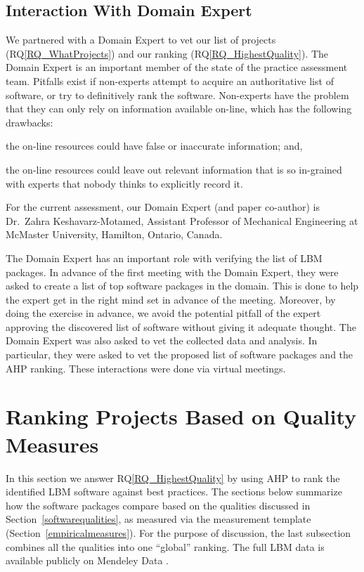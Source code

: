 \documentclass[final, 3p, times, authoryear]{elsarticle}
\newcommand{\rqref}[1]{RQ\ref{#1}}
\begin{document}
\subsection{Interaction With Domain Expert} \label{sec_vet_software_list}

We partnered with a Domain Expert to vet our list of projects
(\rqref{RQ_WhatProjects}) and our ranking (\rqref{RQ_HighestQuality}).  The
Domain Expert is an important member of the state of the practice assessment
team. Pitfalls exist if non-experts attempt to acquire an authoritative list of
software, or try to definitively rank the software. Non-experts have the problem
that they can only rely on information available on-line, which has the
following drawbacks:
\begin{inparaenum}[i)]
  \item the on-line resources could have false or inaccurate information; and,
  \item the on-line resources could leave out relevant information that is so
in-grained with experts that nobody thinks to explicitly record it.
\end{inparaenum}
For the current assessment, our Domain Expert (and paper co-author) is Dr.\
Zahra Keshavarz-Motamed, Assistant Professor of Mechanical Engineering at
McMaster University, Hamilton, Ontario, Canada.  

The Domain Expert has an important role with verifying the list of LBM packages.
In advance of the first meeting with the Domain Expert, they were asked to
create a list of top software packages in the domain.  This is done to help the
expert get in the right mind set in advance of the meeting.  Moreover, by doing
the exercise in advance, we avoid the potential pitfall of the expert approving
the discovered list of software without giving it adequate thought.  The Domain
Expert was also asked to vet the collected data and analysis.  In particular,
they were asked to vet the proposed list of software packages and the AHP
ranking.  These interactions were done via virtual meetings.

\section{Ranking Projects Based on Quality Measures} \label{AHPresults}

In this section we answer \rqref{RQ_HighestQuality} by using AHP to rank the
identified LBM software against best practices.  The sections below summarize
how the software packages compare based on the qualities discussed in
Section~\ref{softwarequalities}, as measured via the measurement template
(Section~\ref{empiricalmeasures}).  For the purpose of discussion, the last
subsection combines all the qualities into one ``global'' ranking.  The full LBM
data is available publicly on Mendeley Data \citep{Smith2022}.
\end{document}
